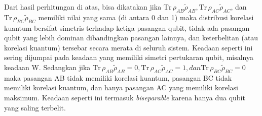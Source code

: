 Dari hasil perhitungan di atas, bisa dikatakan jika $\mathrm{Tr}\,\rho_{AB} \tilde{\rho}_{AB}, \mathrm{Tr}\,\rho_{AC} \tilde{\rho}_{AC}$, dan $\mathrm{Tr}\,\rho_{BC} \tilde{\rho}_{BC}$ memiliki nilai yang sama (di antara 0 dan 1) maka distribusi korelasi kuantum bersifat simetris terhadap ketiga pasangan qubit, tidak ada pasangan qubit yang lebih dominan dibandingkan pasangan lainnya, dan keterbelitan (atau korelasi kuantum) tersebar secara merata di seluruh sistem. Keadaan seperti ini sering dijumpai pada keadaan yang memiliki simetri pertukaran qubit, misalnya keadaan W. Sedangkan jika $\mathrm{Tr}\,\rho_{AB} \tilde{\rho}_{AB}=0, \mathrm{Tr}\,\rho_{AC} \tilde{\rho}_{AC}=1, dan \mathrm{Tr}\,\rho_{BC} \tilde{\rho}_{BC}=0$ maka pasangan AB tidak memiliki korelasi kuantum,
pasangan BC tidak memiliki korelasi kuantum, dan
hanya pasangan AC yang memiliki korelasi maksimum. Keadaan seperti ini termasuk \textit{biseparable} karena hanya dua qubit yang saling terbelit.

